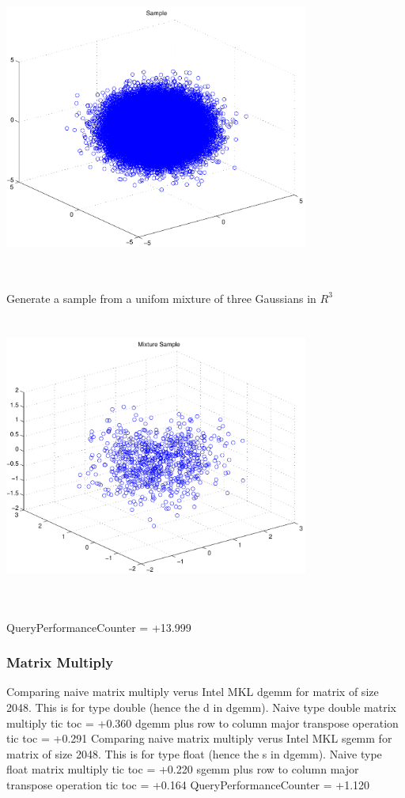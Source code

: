 \documentclass[9pt]{article}
\theoremstyle{plain}
\theoremstyle{definition}
\theoremstyle{remark}
\numberwithin{equation}{section}
\begin{document}
\includegraphics[width=10.0cm,height=10.0cm]{R_3_Normal.pdf}

Generate a sample from a unifom mixture of three Gaussians in $R^3$
\includegraphics[width=10.0cm,height=10.0cm]{R_3_Normal_Mixture.pdf}

QueryPerformanceCounter  =  +13.999
\subsubsection{Matrix Multiply}
Comparing naive matrix multiply verus Intel MKL dgemm for matrix of size 2048.
This is for type double (hence the d in dgemm).
Naive type double matrix multiply tic toc  =  +0.360
dgemm plus row to column major transpose operation tic toc  =  +0.291
Comparing naive matrix multiply verus Intel MKL sgemm for matrix of size 2048.
This is for type float (hence the s in dgemm).
Naive type float matrix multiply tic toc  =  +0.220
sgemm plus row to column major transpose operation tic toc  =  +0.164
QueryPerformanceCounter  =  +1.120
\end{document}
